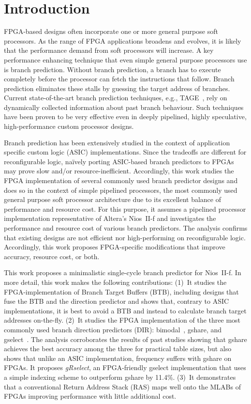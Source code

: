 \chapter{Introduction}
FPGA-based designs often incorporate one or more general purpose soft processors. As the range of FPGA applications broadens and evolves, it is likely that the performance demand from soft processors will increase. A key performance enhancing technique that even simple general purpose processors use is branch prediction. Without branch prediction, a branch has to execute completely before the processor can fetch the instructions that follow. Branch prediction eliminates these stalls by guessing the target address of branches. Current state-of-the-art branch prediction techniques, e.g., TAGE~\cite{tage}, rely on dynamically collected information about past branch behaviour. Such techniques have been proven to be very effective even in deeply pipelined, highly speculative, high-performance custom processor designs.

Branch prediction has been extensively studied in the context of application specific custom logic (ASIC) implementations. Since the tradeoffs are different for reconfigurable logic, na\"ively porting ASIC-based branch predictors to FPGAs may prove slow and/or resource-inefficient. Accordingly, this work studies the FPGA implementation of several commonly used branch predictor designs and does so in the context of simple pipelined processors, the most commonly used general purpose soft processor architecture due to its excellent balance of performance  and resource cost. For this purpose, it assumes a pipelined processor implementation representative of Altera's Nios~II-f and investigates the performance and resource cost of various branch predictors. The analysis confirms that existing designs are not efficient nor high-performing on reconfigurable logic. Accordingly, this work proposes FPGA-specific modifications that improve accuracy, resource cost, or both.

This work proposes a minimalistic single-cycle branch predictor for Nios~II-f. In more detail, this work makes the following contributions:
(1)~It studies the FPGA-implementation of Branch Target Buffers (BTB), including designs that fuse the BTB and the direction predictor and shows that, contrary to ASIC implementations, it is best to avoid a BTB and instead to calculate branch target addresses on-the-fly.
(2)~It studies the FPGA implementation of the three most commonly used branch direction predictors (DIR): bimodal~\cite{bimodal}, gshare, and gselect~\cite{McFarling}. The analysis corroborates the results of past studies showing that gshare achieves the best accuracy among the three for practical table sizes, but also shows that unlike an ASIC implementation, frequency suffers with gshare on FPGAs. It proposes \textit{gRselect}, an FPGA-friendly gselect implementation that uses a simple indexing scheme to outperform gshare by 11.4\%.
(3)~It demonstrates that a conventional Return Address Stack (RAS) maps well onto the MLABs of FPGAs improving performance with little additional cost.

